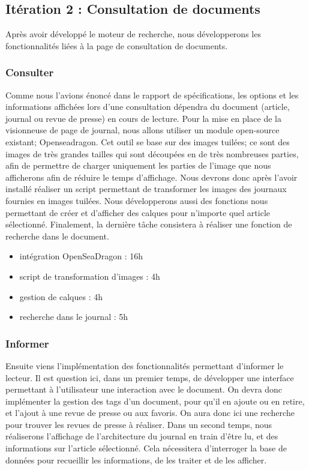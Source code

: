 \subsection{Itération 2 : Consultation de documents}
\label{sec:consultation}

	Après avoir développé le moteur de recherche, nous développerons les fonctionnalités liées à la page de consultation de documents.

	\subsubsection{Consulter}
	\label{subsec:consulter}
		Comme nous l'avions énoncé dans le rapport de spécifications, les options et les informations affichées lors d'une consultation dépendra du document (article, journal ou revue de presse) en cours de lecture.
		Pour la mise en place de la visionneuse de page de journal, nous allons utiliser un module open-source existant; Openseadragon. Cet outil se base sur des images tuilées; ce sont des images de très grandes tailles qui sont découpées en de très nombreuses parties, afin de permettre de charger uniquement les parties de l'image que nous afficherons afin de réduire le temps d'affichage. Nous devrons donc après l'avoir installé réaliser un script permettant de transformer les images des journaux fournies en images tuilées. Nous développerons aussi des fonctions nous permettant de créer et d'afficher des calques pour n'importe quel article sélectionné. Finalement, la dernière tâche consistera à réaliser une fonction de recherche dans le document.

		\begin{itemize}
			\item intégration OpenSeaDragon : 16h
			\item script de transformation d'images : 4h
			\item gestion de calques : 4h
			\item recherche dans le journal : 5h
		\end{itemize}


	\subsubsection{Informer}
	\label{subsec:informer}
		Ensuite viens l'implémentation des fonctionnalités permettant d'informer le lecteur. Il est question ici, dans un premier temps, de développer une interface permettant à l'utilisateur une interaction avec le document. On devra donc implémenter la gestion des tags d'un document, pour qu'il en ajoute ou en retire, et l'ajout à une revue de presse ou aux favoris. On aura donc ici une recherche pour trouver les revues de presse à réaliser. Dans un second temps, nous réaliserons l'affichage de l'architecture du journal en train d'être lu, et des informations sur l'article sélectionné. Cela nécessitera d'interroger la base de données pour recueillir les informations, de les traiter et de les afficher.

